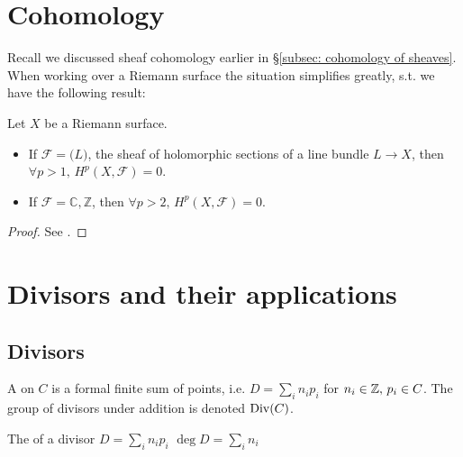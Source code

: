 \documentclass{article}
\begin{document}
\section{Cohomology}
Recall we discussed sheaf cohomology earlier in \S \ref{subsec: cohomology of sheaves}. When working over a Riemann surface the situation simplifies greatly, s.t. we have the following result:
\begin{theorem}
	Let $X$ be a Riemann surface. 
	\begin{itemize}
		\item If $\mathcal{F} = \mathcal(L)$, the sheaf of holomorphic sections of a line bundle $L \to X$, then $\forall p>1, \, H^p(X,\mathcal{F})=0$.
		\item If $\mathcal{F} = \mathbb{C},\mathbb{Z}$, then $\forall p>2, \, H^p(X,\mathcal{F})=0$. 
	\end{itemize} 
\end{theorem}
\begin{proof}
	See \cite{Hitchin2013,Gunning1966}.
\end{proof}



\section{Divisors and their applications}\label{sec: Divisors and their applictions}
\subsection{Divisors}
\begin{definition}
	A  on $C$ is a formal finite sum of points, i.e. $D = \sum_i n_i p_i$ for $n_i \in \mathbb{Z}, \, p_i \in C$. The group of divisors under addition is denoted $\operatorname{Div}(C)$. 
\end{definition}

\begin{definition}
	The  of a divisor $D = \sum_i n_i p_i$ $\deg D = \sum_i n_i $
\end{definition}
\end{document}
